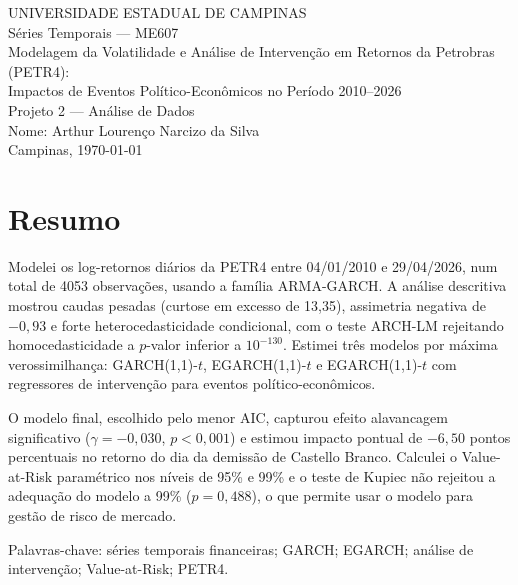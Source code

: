 \documentclass[12pt, a4paper]{article}
\begin{document}
\begin{titlepage}
\centering
\vspace*{2cm}
{\Large UNIVERSIDADE ESTADUAL DE CAMPINAS}\\[0.2cm]
{\large Séries Temporais --- ME607}\\[0.2cm]
{\LARGE Modelagem da Volatilidade e Análise de Intervenção em Retornos da Petrobras (PETR4):\\[0.4cm] Impactos de Eventos Político-Econômicos no Período 2010--2026}\\[2cm]
{\Large Projeto 2 --- Análise de Dados}\\[3cm]
{\large
Nome: Arthur Lourenço Narcizo da Silva\\[0.2cm]
}
\vfill
{\large Campinas, \today}
\end{titlepage}

\tableofcontents
\newpage

\section*{Resumo}

Modelei os log-retornos diários da PETR4 entre 04/01/2010 e 29/04/2026, num total de 4053 observações, usando a família ARMA-GARCH. A análise descritiva mostrou caudas pesadas (curtose em excesso de 13,35), assimetria negativa de $-0{,}93$ e forte heterocedasticidade condicional, com o teste ARCH-LM rejeitando homocedasticidade a $p$-valor inferior a $10^{-130}$. Estimei três modelos por máxima verossimilhança: GARCH(1,1)-$t$, EGARCH(1,1)-$t$ e EGARCH(1,1)-$t$ com regressores de intervenção para eventos político-econômicos.

O modelo final, escolhido pelo menor AIC, capturou efeito alavancagem significativo ($\gamma = -0{,}030$, $p < 0{,}001$) e estimou impacto pontual de $-6{,}50$ pontos percentuais no retorno do dia da demissão de Castello Branco. Calculei o Value-at-Risk paramétrico nos níveis de 95\% e 99\% e o teste de Kupiec não rejeitou a adequação do modelo a 99\% ($p = 0{,}488$), o que permite usar o modelo para gestão de risco de mercado.

\vspace{0.5em}
\noindent Palavras-chave: séries temporais financeiras; GARCH; EGARCH; análise de intervenção; Value-at-Risk; PETR4.
\end{document}
